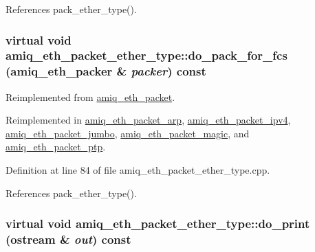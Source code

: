 References pack\_\-ether\_\-type().\hypertarget{classamiq__eth__packet__ether__type_aaa85cf778650e1c1b377392a975cb7bc}{
\subsubsection[{do\_\-pack\_\-for\_\-fcs}]{\setlength{\rightskip}{0pt plus 5cm}virtual void amiq\_\-eth\_\-packet\_\-ether\_\-type::do\_\-pack\_\-for\_\-fcs ({\bf amiq\_\-eth\_\-packer} \& {\em packer}) const}}
\label{classamiq__eth__packet__ether__type_aaa85cf778650e1c1b377392a975cb7bc}


Reimplemented from \hyperlink{classamiq__eth__packet_aacbc675df31e2674b5b4c73c9bd9961e}{amiq\_\-eth\_\-packet}.

Reimplemented in \hyperlink{classamiq__eth__packet__arp_aa94e012455f436aa874eb6e27e02b5fa}{amiq\_\-eth\_\-packet\_\-arp}, \hyperlink{classamiq__eth__packet__ipv4_a9292f2b244e6baae39ba4aeea7b97e8f}{amiq\_\-eth\_\-packet\_\-ipv4}, \hyperlink{classamiq__eth__packet__jumbo_ad1b7057e4292645ccb65b57bcea3a549}{amiq\_\-eth\_\-packet\_\-jumbo}, \hyperlink{classamiq__eth__packet__magic_a0a40225ac5c36e70f413cd6d8ffd9a24}{amiq\_\-eth\_\-packet\_\-magic}, and \hyperlink{classamiq__eth__packet__ptp_a68337ad7c7971f267b692dfbd92ede7b}{amiq\_\-eth\_\-packet\_\-ptp}.

Definition at line 84 of file amiq\_\-eth\_\-packet\_\-ether\_\-type.cpp.

References pack\_\-ether\_\-type().\hypertarget{classamiq__eth__packet__ether__type_a9b2852fa1aaf278138fde2232e446f63}{
\subsubsection[{do\_\-print}]{\setlength{\rightskip}{0pt plus 5cm}virtual void amiq\_\-eth\_\-packet\_\-ether\_\-type::do\_\-print (ostream \& {\em out}) const}}
\label{classamiq__eth__packet__ether__type_a9b2852fa1aaf278138fde2232e446f63}


